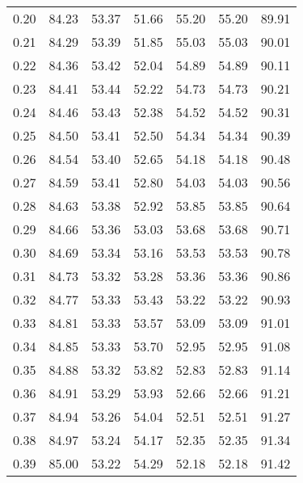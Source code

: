 \begin{tabular}{|c|c|c|c|c|c|c|}
      0.20 &     84.23 &     53.37 &      51.66 &   55.20 &      55.20 &         89.91 \\
      0.21 &     84.29 &     53.39 &      51.85 &   55.03 &      55.03 &         90.01 \\
      0.22 &     84.36 &     53.42 &      52.04 &   54.89 &      54.89 &         90.11 \\
      0.23 &     84.41 &     53.44 &      52.22 &   54.73 &      54.73 &         90.21 \\
      0.24 &     84.46 &     53.43 &      52.38 &   54.52 &      54.52 &         90.31 \\
      0.25 &     84.50 &     53.41 &      52.50 &   54.34 &      54.34 &         90.39 \\
      0.26 &     84.54 &     53.40 &      52.65 &   54.18 &      54.18 &         90.48 \\
      0.27 &     84.59 &     53.41 &      52.80 &   54.03 &      54.03 &         90.56 \\
      0.28 &     84.63 &     53.38 &      52.92 &   53.85 &      53.85 &         90.64 \\
      0.29 &     84.66 &     53.36 &      53.03 &   53.68 &      53.68 &         90.71 \\
      0.30 &     84.69 &     53.34 &      53.16 &   53.53 &      53.53 &         90.78 \\
      0.31 &     84.73 &     53.32 &      53.28 &   53.36 &      53.36 &         90.86 \\
      0.32 &     84.77 &     53.33 &      53.43 &   53.22 &      53.22 &         90.93 \\
      0.33 &     84.81 &     53.33 &      53.57 &   53.09 &      53.09 &         91.01 \\
      0.34 &     84.85 &     53.33 &      53.70 &   52.95 &      52.95 &         91.08 \\
      0.35 &     84.88 &     53.32 &      53.82 &   52.83 &      52.83 &         91.14 \\
      0.36 &     84.91 &     53.29 &      53.93 &   52.66 &      52.66 &         91.21 \\
      0.37 &     84.94 &     53.26 &      54.04 &   52.51 &      52.51 &         91.27 \\
      0.38 &     84.97 &     53.24 &      54.17 &   52.35 &      52.35 &         91.34 \\
      0.39 &     85.00 &     53.22 &      54.29 &   52.18 &      52.18 &         91.42 \\

\end{tabular}
